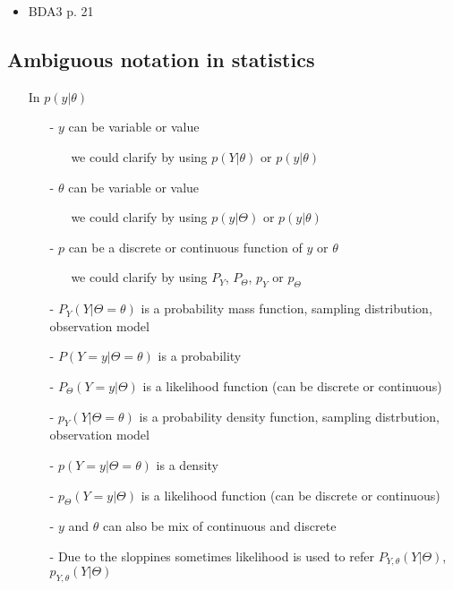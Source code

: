 \documentclass[a4paper,11pt,english]{article}
\begin{document}
  \begin{itemize}
  \item BDA3 p. 21
  \end{itemize}

\subsection*{Ambiguous notation in statistics}
  
  \begin{itemize}
  \item[] In $p(y|\theta)$
  \begin{itemize}
  \item[-] $y$ can be variable or value
    \begin{itemize}
    \item[] we could clarify by using $p(Y|\theta)$ or $p(y|\theta)$
    \end{itemize}
  \item[-] $\theta$ can be variable or value
    \begin{itemize}
    \item[] we could clarify by using $p(y|\Theta)$ or $p(y|\theta)$
    \end{itemize}
  \item[-] $p$ can be a discrete or continuous function of $y$ or $\theta$
    \begin{itemize}
    \item[] we could clarify by using $P_Y$, $P_\Theta$, $p_Y$ or $p_\Theta$
    \end{itemize}
\item[-]
  $P_Y(Y|\Theta=\theta)$ is a probability mass function, sampling distribution, observation model
\item[-]
$P(Y=y|\Theta=\theta)$ is a probability
\item[-]
$P_\Theta(Y=y|\Theta)$ is a likelihood function (can be discrete or continuous)
\item[-] $p_Y(Y|\Theta=\theta)$ is a probability density function, sampling distrbution, observation model
\item[-] $p(Y=y|\Theta=\theta)$ is a density
\item[-] $p_\Theta(Y=y|\Theta)$ is a likelihood function (can be discrete or continuous)
  \item[-] $y$ and $\theta$ can also be mix of continuous and discrete
    \item[-] Due to the sloppines sometimes likelihood is used to refer
$P_{Y,\theta}(Y|\Theta)$, $p_{Y,\theta}(Y|\Theta)$

  \end{itemize}
\end{itemize}
\end{document}
